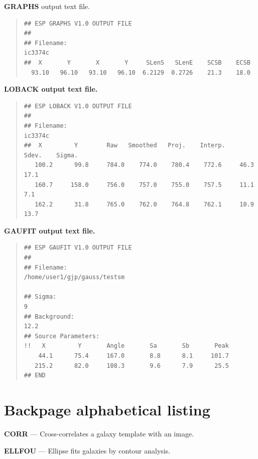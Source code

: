\documentclass[twoside,11pt]{article}
\newenvironment{myquote}{\begin{quote}\begin{small}}{\end{small}\end{quote}}
\begin{document}
\newpage
\textbf{GRAPHS} output text file.

\begin{myquote}
\begin{verbatim}
## ESP GRAPHS V1.0 OUTPUT FILE 
##
## Filename: 
ic3374c                                                   
##  X       Y       X       Y     SLenS   SLenE    SCSB    ECSB
  93.10   96.10   93.10   96.10  6.2129  0.2726    21.3    18.0                 
\end{verbatim}
\end{myquote}


\bf{LOBACK} output text file.

\begin{myquote}
\begin{verbatim}
## ESP LOBACK V1.0 OUTPUT FILE
##
## Filename: 
ic3374c                                                    
##  X         Y        Raw   Smoothed   Proj.    Interp.    Sdev.    Sigma.    
   100.2      99.8     784.0    774.0    780.4    772.6     46.3     17.1       
   160.7     158.0     756.0    757.0    755.0    757.5     11.1      7.1       
   162.2      31.8     765.0    762.0    764.8    762.1     10.9     13.7       
\end{verbatim}
\end{myquote}


\bf{GAUFIT} output text file.

\begin{myquote}
\begin{verbatim}
## ESP GAUFIT V1.0 OUTPUT FILE
##
## Filename: 
/home/user1/gjp/gauss/testsm                                                 
   
## Sigma: 
9
## Background: 
12.2
## Source Parameters:
!!   X         Y       Angle       Sa       Sb       Peak                    
    44.1      75.4     167.0       8.8      8.1     101.7                      
   215.2      82.0     108.3       9.6      7.9      25.5                       
## END
\end{verbatim}
\end{myquote}
 

\newpage
\section{Backpage alphabetical listing}
\label{app:backpage}

{\bf CORR}{ --- Cross-correlates a galaxy template with an image.}
\pageref{des:corr}

{\bf ELLFOU}{ --- Ellipse fits galaxies by contour analysis.}
\pageref{des:ellfou}
\end{document}
